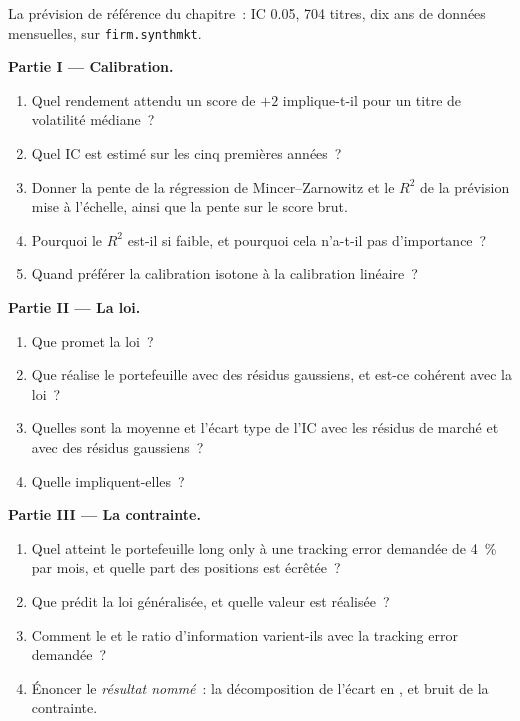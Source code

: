 \begin{problem}\label{pb:rs:from-signal-to-forecast:1}
La prévision de référence du chapitre~: IC 0.05, 704 titres, dix ans de données mensuelles, sur \texttt{firm.synthmkt}.

\medskip\noindent\textbf{Partie I --- Calibration.}
\begin{enumerate}
\item Quel rendement attendu un score de $+2$ implique-t-il pour un titre de volatilité médiane~?
\item Quel IC est estimé sur les cinq premières années~?
\item Donner la pente de la régression de Mincer--Zarnowitz et le $R^2$ de la prévision mise à l'échelle, ainsi que la pente sur le score brut.
\item Pourquoi le $R^2$ est-il si faible, et pourquoi cela n'a-t-il pas d'importance~?
\item Quand préférer la calibration isotone à la calibration linéaire~?
\end{enumerate}

\medskip\noindent\textbf{Partie II --- La loi.}
\begin{enumerate}[resume]
\item Que promet la loi~?
\item Que réalise le portefeuille avec des résidus gaussiens, et est-ce cohérent avec la loi~?
\item Quelles sont la moyenne et l'écart type de l'IC avec les résidus de marché et avec des résidus gaussiens~?
\item Quelle  impliquent-elles~?
\end{enumerate}

\medskip\noindent\textbf{Partie III --- La contrainte.}
\begin{enumerate}[resume]
\item Quel  atteint le portefeuille long only à une tracking error demandée de 4~\% par mois, et quelle part des positions est écrêtée~?
\item Que prédit la loi généralisée, et quelle valeur est réalisée~?
\item Comment le  et le ratio d'information varient-ils avec la tracking error demandée~?
\item Énoncer le \emph{résultat nommé}~: la décomposition de l'écart en ,  et bruit de la contrainte.
\end{enumerate}


\end{problem}
